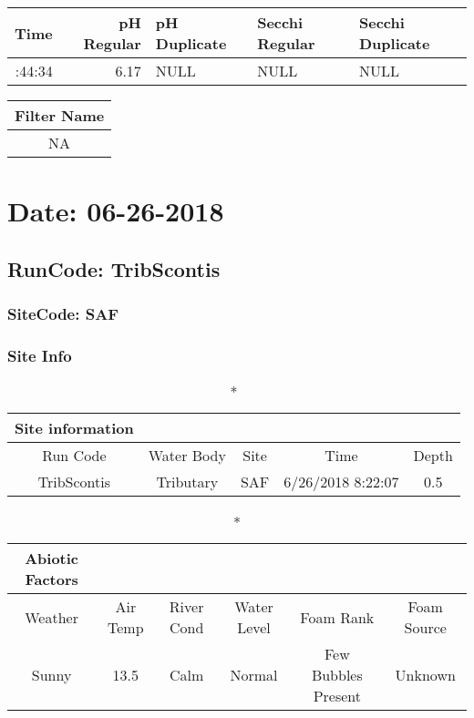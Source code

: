 \documentclass[
  letterpaper,
  DIV=11,
  numbers=noendperiod]{scrartcl}
\begin{document}
\begin{longtable*}{rrlll}
\toprule
Time & pH Regular & pH Duplicate & Secchi Regular & Secchi Duplicate \\ 
\midrule{}:44:34 & 6.17 & NULL & NULL & NULL \\ 
\bottomrule
\end{longtable*}

\begin{longtable*}{c}
\toprule
Filter Name \\ 
\midrule\addlinespace[2.5pt]
NA \\ 
\bottomrule
\end{longtable*}

\hypertarget{date-06-26-2018-4}{%
\section{Date: 06-26-2018}\label{date-06-26-2018-4}}

\hypertarget{runcode-tribscontis-4}{%
\subsection{RunCode: TribScontis}\label{runcode-tribscontis-4}}

\hypertarget{sitecode-saf}{%
\subsubsection{SiteCode: SAF}\label{sitecode-saf}}

\subsubsection{Site Info}

\begin{longtable*}{ccccc}
\caption*{
{\large Site information}
} \\ 
\toprule
Run Code & Water Body & Site & Time & Depth \\ 
\midrule\addlinespace[2.5pt]
TribScontis & Tributary & SAF & 6/26/2018 8:22:07 & 0.5 \\ 
\bottomrule
\end{longtable*}

\begin{longtable*}{cccccc}
\caption*{
{\large Abiotic Factors}
} \\ 
\toprule
Weather & Air Temp & River Cond & Water Level & Foam Rank & Foam Source \\ 
\midrule\addlinespace[2.5pt]
Sunny & 13.5 & Calm & Normal & Few Bubbles Present & Unknown \\ 
\bottomrule
\end{longtable*}
\end{document}
